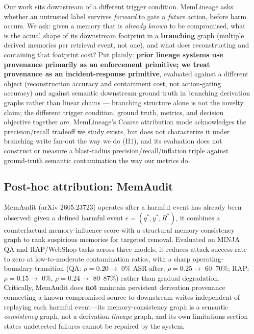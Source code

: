 Our work sits downstream of a different trigger condition. MemLineage
asks whether an untrusted label survives \emph{forward} to gate a
\emph{future} action, before harm occurs. We ask: given a memory that
is \emph{already known} to be compromised, what is the actual shape of
its downstream footprint in a \textbf{branching} graph (multiple
derived memories per retrieval event, not one), and what does
reconstructing and containing that footprint cost? Put plainly:
\textbf{prior lineage systems use provenance primarily as an
enforcement primitive; we treat provenance as an incident-response
primitive}, evaluated against a different object (reconstruction
accuracy and containment cost, not action-gating accuracy) and against
semantic downstream ground truth in branching derivation graphs rather
than linear chains --- branching structure alone is not the novelty
claim; the different trigger condition, ground truth, metrics, and
decision objective together are. MemLineage's Coarse
attribution mode acknowledges the precision/recall tradeoff we study
exists, but does not characterize it under branching write fan-out the
way we do (H1), and its evaluation does not construct or measure a
blast-radius precision/recall/inflation triple against ground-truth
semantic contamination the way our metrics do.

\subsection{Post-hoc attribution: MemAudit}

MemAudit (arXiv 2605.23723) \cite{memaudit} operates after a harmful
event has already been observed: given a defined harmful event $e =
(q^*, y^*, R^*)$, it combines a counterfactual memory-influence score
with a structural memory-consistency graph to rank suspicious memories
for targeted removal. Evaluated on MINJA QA and RAP/WebShop tasks
across three models, it reduces attack success rate to zero at
low-to-moderate contamination ratios, with a sharp operating-boundary
transition (QA: $\rho{=}0.20 \to$ 0\% ASR-after, $\rho{=}0.25 \to$
60--70\%; RAP: $\rho{=}0.15 \to$ 0\%, $\rho{=}0.24 \to$ 80--87\%) rather
than gradual degradation. Critically, MemAudit does \textbf{not}
maintain persistent derivation provenance connecting a known-compromised
source to downstream writes independent of replaying each harmful
event---its memory-consistency graph is a semantic \emph{consistency}
graph, not a derivation \emph{lineage} graph, and its own limitations
section states undetected failures cannot be repaired by the system.

